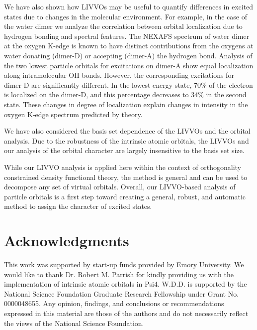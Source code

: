 \documentclass{article}
\begin{document}
We have also shown how LIVVOs may be useful to quantify differences in excited states due to changes in the molecular environment.
For example, in the case of the water dimer we analyze the correlation between orbital localization due to hydrogen bonding and spectral features.
The NEXAFS spectrum of water dimer at the oxygen K-edge is known to have distinct contributions from the oxygens at water donating (dimer-D) or accepting (dimer-A) the hydrogen bond. 
Analysis of the two lowest particle orbitals for excitations on dimer-A show equal localization along intramolecular OH bonds.
However, the corresponding excitations for dimer-D are significantly different.
In the lowest energy state, 70\% of the electron is localized on the dimer-D, and this percentage decreases to 34\% in the second state.
These changes in degree of localization explain changes in intensity in the oxygen K-edge spectrum predicted by theory.

We have also considered the basis set dependence of the LIVVOs and the orbital analysis. Due to the robustness of the intrinsic atomic orbitals, the LIVVOs and our analysis of the orbital character are largely insensitive to the basis set size.

While our LIVVO analysis is applied here within the context of orthogonality constrained density functional theory, the method is general and can be used to decompose any set of virtual orbitals.
Overall, our LIVVO-based analysis of particle orbitals is a first step toward creating a general, robust, and automatic method to assign the character of excited states.

\newpage

\section*{Acknowledgments}
This work was supported by start-up funds provided by Emory University.
We would like to thank  Dr. Robert M. Parrish for kindly providing us with the implementation of intrinsic atomic orbitals in Psi4.
W.D.D. is supported by the National Science Foundation Graduate Research Fellowship under Grant No. 0000048655. Any opinion, findings, and conclusions or recommendations expressed in this material are those of the authors and do not necessarily reflect the views of the National Science Foundation.


{\footnotesize


}
\end{document}
